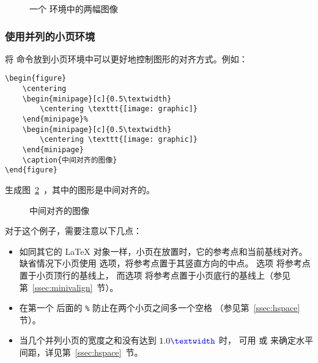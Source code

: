 \begin{figure} 
	\centering 
	\resizebox{1in}{!}{\usebox{\boxgraphic}}%
	\hspace{1in}%
	\resizebox{2in}{!}{\usebox{\boxgraphic}}
	\caption{一个  环境中的两幅图像}\label{fig:sidegraphics}
\end{figure}

\subsubsection{使用并列的小页环境}

将  命令放到小页环境中可以更好地控制图形的对齐方式。例如：
\begin{lstlisting}
\begin{figure} 
	\centering 
	\begin{minipage}[c]{0.5\textwidth} 
		\centering \texttt{[image: graphic]} 
	\end{minipage}% 
	\begin{minipage}[c]{0.5\textwidth} 
		\centering \texttt{[image: graphic]} 
	\end{minipage} 
	\caption{中间对齐的图像} 
\end{figure}
\end{lstlisting}
生成图~\ref{fig:minipagegraphics}~，其中的图形是中间对齐的。

\begin{figure} 
	\centering 
	\begin{minipage}[c]{0.5\textwidth} 
		\centering
		\resizebox{1in}{!}{\usebox{\boxgraphic}} 
	\end{minipage}%
	\begin{minipage}[c]{0.5\textwidth} 
		\centering
		\resizebox{2in}{!}{\usebox{\boxgraphic}} 
	\end{minipage} 
	\caption{中间对齐的图像} \label{fig:minipagegraphics}
\end{figure}

对于这个例子，需要注意以下几点：
\begin{itemize}
	\item 如同其它的 \LaTeX{} 对象一样，小页在放置时，它的参考点和当前基线对齐。
	缺省情况下小页使用 \opt{[c]} 选项，将参考点置于其竖直方向的中点。
	选项 \opt{[t]} 将参考点置于小页顶行的基线上，
	而选项 \opt{[b]} 将参考点置于小页底行的基线上（参见第~\ref{ssec:minivalign}~节）。
	
	\item 在第一个  后面的 \texttt{\%} 防止在两个小页之间多一个空格
	（参见第~\ref{ssec:hspace} 节）。
	
	\item 当几个并列小页的宽度之和没有达到 $1.0\text{\cmd{textwidth}}$ 时，
	可用  或  来确定水平间距，详见第~\ref{ssec:hspace}~节。
\end{itemize}


